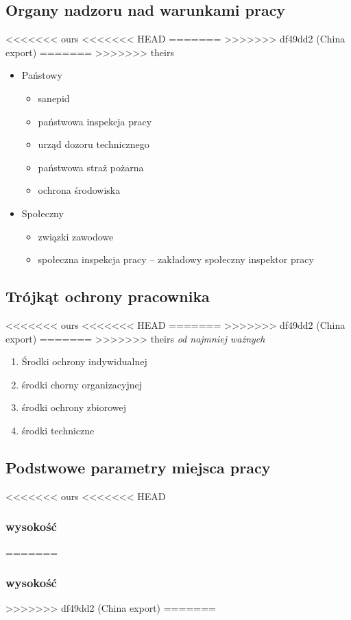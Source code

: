 \documentclass[11pt]{article}
\begin{document}
\subsection{Organy nadzoru nad warunkami pracy}
<<<<<<< ours
<<<<<<< HEAD
\label{sec:org789f36e}
=======
\label{sec:orga0a5afa}
>>>>>>> df49dd2 (China export)
=======
\label{sec:orga0a5afa}
>>>>>>> theirs
\begin{itemize}
\item Państowy
\begin{itemize}
\item sanepid
\item państwowa inspekcja pracy
\item urząd dozoru technicznego
\item państwowa straż pożarna
\item ochrona środowiska
\end{itemize}
\item Społeczny
\begin{itemize}
\item związki zawodowe
\item społeczna inspekcja pracy -- zakładowy społeczny inspektor pracy
\end{itemize}
\end{itemize}
\subsection{Trójkąt ochrony pracownika}
<<<<<<< ours
<<<<<<< HEAD
\label{sec:orga5920e5}
=======
\label{sec:org6b5b530}
>>>>>>> df49dd2 (China export)
=======
\label{sec:org6b5b530}
>>>>>>> theirs
\emph{od najmniej ważnych}
\begin{enumerate}
\item Środki ochrony indywidualnej
\item środki chorny organizacyjnej
\item środki ochrony zbiorowej
\item środki techniczne
\end{enumerate}
\subsection{Podstwowe parametry miejsca pracy}
<<<<<<< ours
<<<<<<< HEAD
\label{sec:orgb194246}
\subsubsection{wysokość}
\label{sec:orge1c56fd}
=======
\label{sec:org0d98a5f}
\subsubsection{wysokość}
\label{sec:org1403e45}
>>>>>>> df49dd2 (China export)
=======
\label{sec:org0d98a5f}
\end{document}
